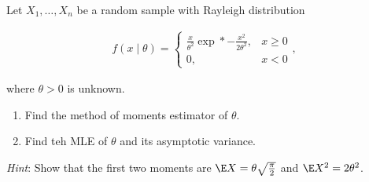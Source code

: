 
\begin{exercise}

Let $X_1, \dots, X_n$ be a random sample with Rayleigh distribution

\begin{align*}
    f(x \mid \theta)
    =
    \begin{cases}
        \frac{x}{\theta^2} \exp*{-\frac{x^2}{2 \theta^2}},
        & x \geq 0 \\
        0,
        & x < 0
    \end{cases},
\end{align*}

where $\theta > 0$ is unknown.

\begin{enumerate}[label = (\alph*)]
    \item Find the method of moments estimator of $\theta$.
    \item Find teh MLE of $\theta$ and its asymptotic variance.
\end{enumerate}

\textit{Hint}:
Show that the first two moments are $\E X = \theta \sqrt \frac{\pi}{2}$ and $\E X^2 = 2 \theta^2$.

\end{exercise}


